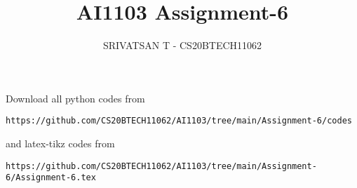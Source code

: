 \documentclass[journal,12pt,twocolumn]{IEEEtran}
\DeclareMathOperator*{\Res}{Res}
\begin{document}
\newcommand{\BEQA}{\begin{eqnarray}}
        \newcommand{\EEQA}{\end{eqnarray}}
\newcommand{\define}{\stackrel{\triangle}{=}}

\raggedbottom
\setlength{\parindent}{0pt}
\providecommand{\mbf}{\mathbf}
\providecommand{\pr}[1]{\ensuremath{\Pr\left(#1\right)}}
\providecommand{\qfunc}[1]{\ensuremath{Q\left(#1\right)}}
\providecommand{\sbrak}[1]{\ensuremath{{}\left[#1\right]}}
\providecommand{\lsbrak}[1]{\ensuremath{{}\left[#1\right.}}
\providecommand{\rsbrak}[1]{\ensuremath{{}\left.#1\right]}}
\providecommand{\brak}[1]{\ensuremath{\left(#1\right)}}
\providecommand{\lbrak}[1]{\ensuremath{\left(#1\right.}}
\providecommand{\rbrak}[1]{\ensuremath{\left.#1\right)}}
\providecommand{\cbrak}[1]{\ensuremath{\left\{#1\right\}}}
\providecommand{\lcbrak}[1]{\ensuremath{\left\{#1\right.}}
\providecommand{\rcbrak}[1]{\ensuremath{\left.#1\right\}}}
\theoremstyle{remark}
\newtheorem{rem}{Remark}
\newcommand{\sgn}{\mathop{\mathrm{sgn}}}
\providecommand{\abs}[1]{\vert#1\vert}
\providecommand{\res}[1]{\Res\displaylimits_{#1}}
\providecommand{\norm}[1]{\lVert#1\rVert}
\providecommand{\mtx}[1]{\mathbf{#1}}
\providecommand{\mean}[1]{E[#1]}
\providecommand{\fourier}{\overset{\mathcal{F}}{ \rightleftharpoons}}
\providecommand{\system}{\overset{\mathcal{H}}{ \longleftrightarrow}}
\newcommand{\solution}{\noindent \textbf{Solution: }}
\newcommand{\cosec}{\,\text{cosec}\,}
\newcommand{\comb}[2]{{}^{#1}\mathrm{C}_{#2}}
\providecommand{\dec}[2]{\ensuremath{\overset{#1}{\underset{#2}{\gtrless}}}}
\newcommand{\myvec}[1]{\ensuremath{\begin{pmatrix}#1\end{pmatrix}}}
\newcommand{\mydet}[1]{\ensuremath{\begin{vmatrix}#1\end{vmatrix}}}
\makeatletter
{}
\makeatother
\let\StandardTheFigure\thefigure
\let\vec\mathbf
\renewcommand{\thefigure}{\theproblem}
\def\putbox#1#2#3{\makebox[0in][l]{\makebox[#1][l]{}\raisebox{\baselineskip}[0in][0in]{\raisebox{#2}[0in][0in]{#3}}}}
\def\rightbox#1{\makebox[0in][r]{#1}}
\def\centbox#1{\makebox[0in]{#1}}
\def\topbox#1{\raisebox{-\baselineskip}[0in][0in]{#1}}
\def\midbox#1{\raisebox{-0.5\baselineskip}[0in][0in]{#1}}
\vspace{3cm}
\title{AI1103 Assignment-6}
\author{SRIVATSAN T - CS20BTECH11062}
\maketitle
\newpage
\bigskip
\renewcommand{\thefigure}{\theenumi}
\renewcommand{\thetable}{\theenumi}
Download all python codes from
\begin{lstlisting}
https://github.com/CS20BTECH11062/AI1103/tree/main/Assignment-6/codes
\end{lstlisting}
%
and latex-tikz codes from
%
\begin{lstlisting}
https://github.com/CS20BTECH11062/AI1103/tree/main/Assignment-6/Assignment-6.tex
\end{lstlisting}
\end{document}
